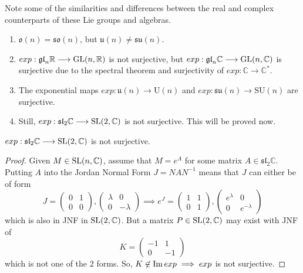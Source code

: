     Note some of the similarities and differences between the real and complex counterparts of these Lie groups and algebras. 
    \begin{enumerate}
      \item $\mathfrak{o}(n) = \mathfrak{so}(n)$, but $\mathfrak{u}(n) \neq \mathfrak{su}(n)$. 
      \item $exp: \mathfrak{gl}_n \mathbb{R} \longrightarrow \operatorname{GL}(n, \mathbb{R})$ is not surjective, but $exp: \mathfrak{gl}_n \mathbb{C} \longrightarrow \operatorname{GL}(n, \mathbb{C})$ is surjective due to the spectral theorem and surjectivity of $exp: \mathbb{C} \longrightarrow \mathbb{C}^*$.
      \item The exponential maps $exp: \mathfrak{u}(n) \longrightarrow \text{U}(n)$ and $exp: \mathfrak{su}(n) \longrightarrow \text{SU}(n)$ are surjective. 
      \item Still, $exp: \mathfrak{sl}_2 \mathbb{C} \longrightarrow \operatorname{SL}(2, \mathbb{C})$ is not surjective. This will be proved now. 
    \end{enumerate}

    \begin{theorem}
      $exp: \mathfrak{sl}_2 \mathbb{C} \longrightarrow \operatorname{SL}(2, \mathbb{C})$ is not surjective. 
    \end{theorem}
    \begin{proof}
      Given $M \in \operatorname{SL}(n, \mathbb{C})$, assume that $M = e^A$ for some matrix $A \in \mathfrak{sl}_2 \mathbb{C}$. Putting $A$ into the Jordan Normal Form $J = N A N^{-1}$ means that $J$ can either be of form
      \begin{equation}
        J = \begin{pmatrix}
        0&1\\0&0
        \end{pmatrix}, \begin{pmatrix}
        \lambda&0\\0&-\lambda
        \end{pmatrix} \implies e^J = \begin{pmatrix}
        1&1\\0&1
        \end{pmatrix}, \begin{pmatrix}
        e^\lambda&0\\0&e^{-\lambda}
        \end{pmatrix}
      \end{equation}
      which is also in JNF in $\operatorname{SL}(2, \mathbb{C})$. But a matrix $P \in \operatorname{SL}(2, \mathbb{C})$ may exist with JNF of 
      \begin{equation}
        K = \begin{pmatrix}
        -1&1\\0&-1
        \end{pmatrix}
      \end{equation}
      which is not one of the 2 forms. So, $K \not\in \operatorname{Im}{exp} \implies exp$ is not surjective. 
    \end{proof}


